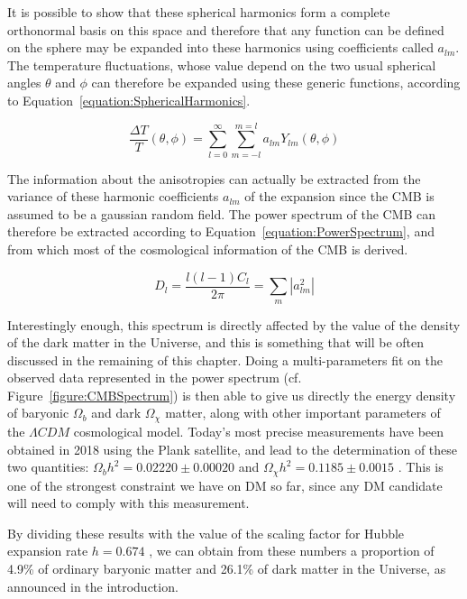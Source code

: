 \documentclass[a4paper, 10pt, openright]{report}
\begin{document}
It is possible to show that these spherical harmonics form a complete orthonormal basis on this space and therefore that any function can be defined on the sphere may be expanded into these harmonics using coefficients called $a_{lm}$. The temperature fluctuations, whose value depend on the two usual spherical angles $\theta$ and $\phi$ can therefore be expanded using these generic functions, according to Equation~\ref{equation:SphericalHarmonics}.

\begin{equation} \label{equation:SphericalHarmonics}
\frac{\Delta T}{T}(\theta, \phi) = \sum_{l=0}^{\infty} \sum_{m=-l}^{m=l} a_{lm} Y_{lm} (\theta, \phi)
\end{equation}

The information about the anisotropies can actually be extracted from the variance of these harmonic coefficients $a_{lm}$ of the expansion since the \ac{CMB} is assumed to be a gaussian random field. The power spectrum of the \ac{CMB} can therefore be extracted according to Equation~\ref{equation:PowerSpectrum}, and from which most of the cosmological information of the \ac{CMB} is derived.

\begin{equation} \label{equation:PowerSpectrum}
D_l = \frac{l(l-1) C_l} {2\pi} = \sum_m |a_{lm}^2|
\end{equation}

Interestingly enough, this spectrum is directly affected by the value of the density of the dark matter in the Universe, and this is something that will be often discussed in the remaining of this chapter. Doing a multi-parameters fit on the observed data represented in the power spectrum (cf. Figure~\ref{figure:CMBSpectrum}) is then able to give us directly the energy density of baryonic $\Omega_b$ and dark $\Omega_\chi$ matter, along with other important parameters of the $\Lambda CDM$ cosmological model. Today's most precise measurements have been obtained in 2018 using the Plank satellite, and lead to the determination of these two quantities: $\Omega_b h^2 = 0.02220 \pm 0.00020$ and $\Omega_\chi h^2 = 0.1185 \pm 0.0015$ \cite{Planck}. This is one of the strongest constraint we have on \ac{DM} so far, since any \ac{DM} candidate will need to comply with this measurement.

By dividing these results with the value of the scaling factor for Hubble expansion rate $h = 0.674$ \cite{Constants}, we can obtain from these numbers a proportion of 4.9\% of ordinary baryonic matter and 26.1\% of dark matter in the Universe, as announced in the introduction.
\end{document}
